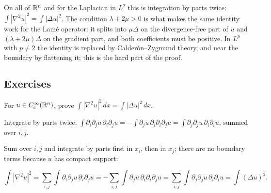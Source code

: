 On all of $\mathbb{R}^n$ and for the Laplacian in $L^2$ this is integration by parts twice: $\int|\nabla^2 u|^2 = \int|\Delta u|^2$. The condition $\lambda+2\mu> 0$ is what makes the same identity work for the Lamé operator: it splits into $\mu\Delta$ on the divergence-free part of $u$ and $(\lambda+2\mu)\Delta$ on the gradient part, and both coefficients must be positive. In $L^p$ with $p\ne2$ the identity is replaced by Calderón--Zygmund theory, and near the boundary by flattening it; this is the hard part of the proof.

\subsection*{Exercises}

\begin{exercise}
  For $u \in C_c^\infty(\mathbb{R}^n)$, prove $\int|\nabla^2 u|^2\,dx = \int|\Delta u|^2\,dx$.
  \begin{hint}
    Integrate by parts twice: $\int \partial_i\partial_j u\,\partial_i\partial_j u = -\int \partial_j u\,\partial_i\partial_i\partial_j u = \int \partial_j\partial_j u\,\partial_i\partial_i u$, summed over $i, j$.
  \end{hint}
  \begin{solution}
    Sum over $i, j$ and integrate by parts first in $x_i$, then in $x_j$; there are no boundary terms because $u$ has compact support:

    \[ \int|\nabla^2u|^2 = \sum_{i,j}\int\partial_i\partial_ju\,\partial_i\partial_ju = -\sum_{i,j}\int\partial_ju\,\partial_i\partial_i\partial_ju
             = \sum_{i,j}\int\partial_j\partial_ju\,\partial_i\partial_iu = \int(\Delta u)^2. \]
  \end{solution}
\end{exercise}


